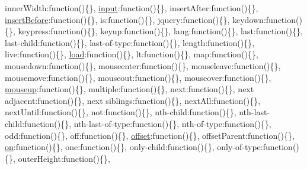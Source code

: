 \begin{DoxyCompactItemize}
\textquotesingle{}inner\+Width\textquotesingle{}\+:function()\{\}, \textquotesingle{}\hyperlink{jquery_8unobtrusive-ajax_8min_8js_a22211e450825dd03852dfba097324407}{input}\textquotesingle{}\+:function()\{\}, \textquotesingle{}insert\+After\textquotesingle{}\+:function()\{\}, \textquotesingle{}\hyperlink{_facebook_8js_a70584eacdd0610d73427e22a0ddc83a0}{insert\+Before}\textquotesingle{}\+:function()\{\}, \textquotesingle{}is\textquotesingle{}\+:function()\{\}, \textquotesingle{}jquery\textquotesingle{}\+:function()\{\}, \textquotesingle{}keydown\textquotesingle{}\+:function()\{\}, \textquotesingle{}keypress\textquotesingle{}\+:function()\{\}, \textquotesingle{}keyup\textquotesingle{}\+:function()\{\}, \textquotesingle{}lang\textquotesingle{}\+:function()\{\}, \textquotesingle{}last\textquotesingle{}\+:function()\{\}, \textquotesingle{}last-\/child\textquotesingle{}\+:function()\{\}, \textquotesingle{}last-\/of-\/type\textquotesingle{}\+:function()\{\}, \textquotesingle{}length\textquotesingle{}\+:function()\{\}, \textquotesingle{}live\textquotesingle{}\+:function()\{\}, \textquotesingle{}\hyperlink{_scripts_2jquery-1_810_82_8js_a8d0b9ec82c308161432f1c387d2fc2a7}{load}\textquotesingle{}\+:function()\{\}, \textquotesingle{}lt\textquotesingle{}\+:function()\{\}, \textquotesingle{}map\textquotesingle{}\+:function()\{\}, \textquotesingle{}mousedown\textquotesingle{}\+:function()\{\}, \textquotesingle{}mouseenter\textquotesingle{}\+:function()\{\}, \textquotesingle{}mouseleave\textquotesingle{}\+:function()\{\}, \textquotesingle{}mousemove\textquotesingle{}\+:function()\{\}, \textquotesingle{}mouseout\textquotesingle{}\+:function()\{\}, \textquotesingle{}mouseover\textquotesingle{}\+:function()\{\}, \textquotesingle{}\hyperlink{login_8js_ad9817e59ccfba0dc64521491b4475482}{mouseup}\textquotesingle{}\+:function()\{\}, \textquotesingle{}multiple\textquotesingle{}\+:function()\{\}, \textquotesingle{}next\textquotesingle{}\+:function()\{\}, \textquotesingle{}next adjacent\textquotesingle{}\+:function()\{\}, \textquotesingle{}next siblings\textquotesingle{}\+:function()\{\}, \textquotesingle{}next\+All\textquotesingle{}\+:function()\{\}, \textquotesingle{}next\+Until\textquotesingle{}\+:function()\{\}, \textquotesingle{}not\textquotesingle{}\+:function()\{\}, \textquotesingle{}nth-\/child\textquotesingle{}\+:function()\{\}, \textquotesingle{}nth-\/last-\/child\textquotesingle{}\+:function()\{\}, \textquotesingle{}nth-\/last-\/of-\/type\textquotesingle{}\+:function()\{\}, \textquotesingle{}nth-\/of-\/type\textquotesingle{}\+:function()\{\}, \textquotesingle{}odd\textquotesingle{}\+:function()\{\}, \textquotesingle{}off\textquotesingle{}\+:function()\{\}, \textquotesingle{}\hyperlink{_scripts_2jquery-1_810_82_8js_a4a9f594d20d927164551fc7fa4751a2f}{offset}\textquotesingle{}\+:function()\{\}, \textquotesingle{}offset\+Parent\textquotesingle{}\+:function()\{\}, \textquotesingle{}\hyperlink{jquery_8unobtrusive-ajax_8js_a648b859bde60b7a95b18a751706aca83}{on}\textquotesingle{}\+:function()\{\}, \textquotesingle{}one\textquotesingle{}\+:function()\{\}, \textquotesingle{}only-\/child\textquotesingle{}\+:function()\{\}, \textquotesingle{}only-\/of-\/type\textquotesingle{}\+:function()\{\}, \textquotesingle{}outer\+Height\textquotesingle{}\+:function()\{\}, 
\end{DoxyCompactItemize}
